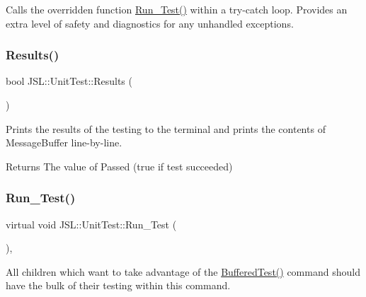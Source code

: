 Calls the overridden function \hyperlink{classJSL_1_1UnitTest_aa8369ab1ce2a537bff2ea7e1c8818490}{Run\+\_\+\+Test()} within a try-\/catch loop. Provides an extra level of safety and diagnostics for any unhandled exceptions. 

\mbox{\label{classJSL_1_1UnitTest_a39e1076dd985334ce21606ae2a383f70}} 
\subsubsection{\texorpdfstring{Results()}{Results()}}
{\footnotesize\ttfamily bool J\+S\+L\+::\+Unit\+Test\+::\+Results (\begin{DoxyParamCaption}{ }\end{DoxyParamCaption})\hspace{0.3cm}{\ttfamily [inline]}}



Prints the results of the testing to the terminal and prints the contents of Message\+Buffer line-\/by-\/line. 

\begin{DoxyReturn}{Returns}
The value of Passed (true if test succeeded) 
\end{DoxyReturn}
\mbox{\label{classJSL_1_1UnitTest_aa8369ab1ce2a537bff2ea7e1c8818490}} 
\subsubsection{\texorpdfstring{Run\+\_\+\+Test()}{Run\_Test()}}
{\footnotesize\ttfamily virtual void J\+S\+L\+::\+Unit\+Test\+::\+Run\+\_\+\+Test (\begin{DoxyParamCaption}{ }\end{DoxyParamCaption})\hspace{0.3cm}{\ttfamily [inline]}, {\ttfamily [virtual]}}



All children which want to take advantage of the \hyperlink{classJSL_1_1UnitTest_aabec19b081be8a428f12e4b5e3dc2a9c}{Buffered\+Test()} command should have the bulk of their testing within this command. 




